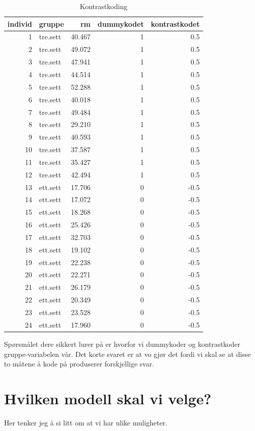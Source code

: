 \documentclass[
]{book}
\begin{document}
\begin{table}

\caption{\label{tab:unnamed-chunk-6}Kontrastkoding}
\centering
\begin{tabular}[t]{r|l|r|r|r}
\hline
individ & gruppe & rm & dummykodet & kontrastkodet\\
\hline
1 & tre.sett & 40.467 & 1 & 0.5\\
\hline
2 & tre.sett & 49.072 & 1 & 0.5\\
\hline
3 & tre.sett & 47.941 & 1 & 0.5\\
\hline
4 & tre.sett & 44.514 & 1 & 0.5\\
\hline
5 & tre.sett & 52.288 & 1 & 0.5\\
\hline
6 & tre.sett & 40.018 & 1 & 0.5\\
\hline
7 & tre.sett & 49.484 & 1 & 0.5\\
\hline
8 & tre.sett & 29.210 & 1 & 0.5\\
\hline
9 & tre.sett & 40.593 & 1 & 0.5\\
\hline
10 & tre.sett & 37.587 & 1 & 0.5\\
\hline
11 & tre.sett & 35.427 & 1 & 0.5\\
\hline
12 & tre.sett & 42.494 & 1 & 0.5\\
\hline
13 & ett.sett & 17.706 & 0 & -0.5\\
\hline
14 & ett.sett & 17.072 & 0 & -0.5\\
\hline
15 & ett.sett & 18.268 & 0 & -0.5\\
\hline
16 & ett.sett & 25.426 & 0 & -0.5\\
\hline
17 & ett.sett & 32.703 & 0 & -0.5\\
\hline
18 & ett.sett & 19.102 & 0 & -0.5\\
\hline
19 & ett.sett & 22.238 & 0 & -0.5\\
\hline
20 & ett.sett & 22.271 & 0 & -0.5\\
\hline
21 & ett.sett & 26.179 & 0 & -0.5\\
\hline
22 & ett.sett & 20.349 & 0 & -0.5\\
\hline
23 & ett.sett & 23.528 & 0 & -0.5\\
\hline
24 & ett.sett & 17.960 & 0 & -0.5\\
\hline
\end{tabular}
\end{table}

Spørsmålet dere sikkert lurer på er hvorfor vi dummykoder og kontrastkoder gruppe-variabelen vår. Det korte svaret er at vo gjør det fordi vi skal se at disse to måtene å kode på produserer forskjellige svar.

\hypertarget{hvilken-modell-skal-vi-velge}{%
\chapter{Hvilken modell skal vi velge?}\label{hvilken-modell-skal-vi-velge}}

Her tenker jeg å si litt om at vi har ulike muligheter.

\hypertarget{appendix-appendices}{%
\appendix}


  
\end{document}

